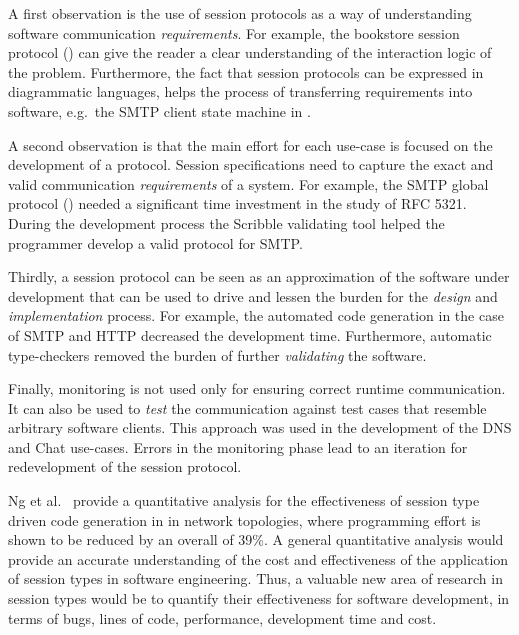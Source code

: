 A first observation is the use of session protocols
as a way of understanding software communication
{\em requirements}. For example, the bookstore
session protocol () can give
the reader a clear understanding of the interaction logic of
the problem. Furthermore, the fact that session protocols
can be expressed in diagrammatic languages, helps
the process of transferring requirements into software,
e.g.~the SMTP client state machine in .

A second observation is that the main effort for each use-case
is focused on the development of a protocol.
Session specifications need to capture the exact
and valid communication {\em requirements} of a system.
For example, the SMTP global protocol () %
needed a significant time investment in the study of RFC 5321. %
During the development process the Scribble validating tool
helped the programmer develop a valid protocol for SMTP.

Thirdly, a session protocol can be seen as an approximation
of the software under development that can be used to drive
and lessen the burden for the {\em design} and {\em implementation} process.
For example, the automated code generation in the case of
SMTP and HTTP decreased the development time. Furthermore,
automatic type-checkers removed the burden of further
{\em validating} the software.

Finally, monitoring is not used only for ensuring
correct runtime communication.
It can also be used to {\em test} the communication
against test cases that resemble arbitrary software clients.
This approach was used in the development of the DNS and
Chat use-cases. Errors in the monitoring phase
lead to an iteration for redevelopment of the session protocol.


Ng et al.~\cite{NCY2015} provide a quantitative analysis
for the effectiveness of session type driven code generation in
in network topologies, where programming effort is shown to
be reduced by an overall of 39\%.
A general quantitative analysis would provide an accurate understanding of the cost and effectiveness of the application of session types in software engineering.
Thus, a valuable new area of research in session types would
be to quantify their effectiveness for software development,
in terms of bugs, lines of code, performance, development time and cost.

